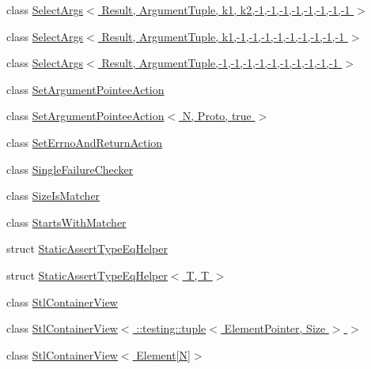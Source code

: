 \begin{DoxyCompactItemize}
class \hyperlink{classtesting_1_1internal_1_1_select_args_3_01_result_00_01_argument_tuple_00_01k1_00_01k2_00-1_014202daea627b6852873e503b1bfe3a0}{Select\+Args$<$ Result, Argument\+Tuple, k1, k2,-\/1,-\/1,-\/1,-\/1,-\/1,-\/1,-\/1,-\/1 $>$}
\item 
class \hyperlink{classtesting_1_1internal_1_1_select_args_3_01_result_00_01_argument_tuple_00_01k1_00-1_00-1_00-16ae4dde9341810fff5dd4b06d1d121a8}{Select\+Args$<$ Result, Argument\+Tuple, k1,-\/1,-\/1,-\/1,-\/1,-\/1,-\/1,-\/1,-\/1,-\/1 $>$}
\item 
class \hyperlink{classtesting_1_1internal_1_1_select_args_3_01_result_00_01_argument_tuple_00-1_00-1_00-1_00-1_005f626e5adb9246c46f665dbb755b50f6}{Select\+Args$<$ Result, Argument\+Tuple,-\/1,-\/1,-\/1,-\/1,-\/1,-\/1,-\/1,-\/1,-\/1,-\/1 $>$}
\item 
class \hyperlink{classtesting_1_1internal_1_1_set_argument_pointee_action}{Set\+Argument\+Pointee\+Action}
\item 
class \hyperlink{classtesting_1_1internal_1_1_set_argument_pointee_action_3_01_n_00_01_proto_00_01true_01_4}{Set\+Argument\+Pointee\+Action$<$ N, Proto, true $>$}
\item 
class \hyperlink{classtesting_1_1internal_1_1_set_errno_and_return_action}{Set\+Errno\+And\+Return\+Action}
\item 
class \hyperlink{classtesting_1_1internal_1_1_single_failure_checker}{Single\+Failure\+Checker}
\item 
class \hyperlink{classtesting_1_1internal_1_1_size_is_matcher}{Size\+Is\+Matcher}
\item 
class \hyperlink{classtesting_1_1internal_1_1_starts_with_matcher}{Starts\+With\+Matcher}
\item 
struct \hyperlink{structtesting_1_1internal_1_1_static_assert_type_eq_helper}{Static\+Assert\+Type\+Eq\+Helper}
\item 
struct \hyperlink{structtesting_1_1internal_1_1_static_assert_type_eq_helper_3_01_t_00_01_t_01_4}{Static\+Assert\+Type\+Eq\+Helper$<$ T, T $>$}
\item 
class \hyperlink{classtesting_1_1internal_1_1_stl_container_view}{Stl\+Container\+View}
\item 
class \hyperlink{classtesting_1_1internal_1_1_stl_container_view_3_01_1_1testing_1_1tuple_3_01_element_pointer_00_01_size_01_4_01_4}{Stl\+Container\+View$<$ \+::testing\+::tuple$<$ Element\+Pointer, Size $>$ $>$}
\item 
class \hyperlink{classtesting_1_1internal_1_1_stl_container_view_3_01_element[_n]_4}{Stl\+Container\+View$<$ Element\mbox{[}\+N\mbox{]}$>$}

\end{DoxyCompactItemize}

